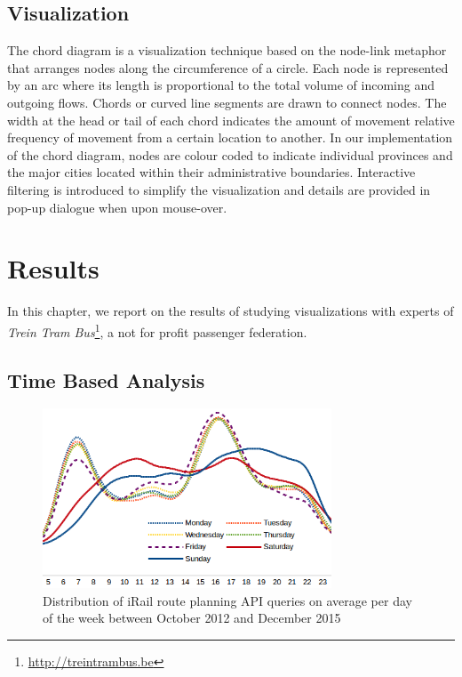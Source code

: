 \documentclass{sig-alternate}
\begin{document}
\subsection{Visualization}\label{sec:vis}
The chord diagram is a visualization technique based on the node-link metaphor that arranges nodes along the circumference of a circle. 
Each node is represented by an arc where its length is proportional to the total volume of incoming and outgoing flows. 
Chords or curved line segments are drawn to connect nodes. 
The width at the head or tail of each chord indicates the amount of movement relative frequency of movement from a certain location to another.
In our implementation of the chord diagram, nodes are colour coded to indicate individual provinces and the major cities located within their administrative boundaries. 
Interactive filtering is introduced to simplify the visualization and details are provided in pop-up dialogue when upon mouse-over.

\section{Results}
\label{sec:results}

In this chapter, we report on the results of studying visualizations with experts of \emph{Trein Tram Bus}\footnote{\url{http://treintrambus.be}}, a not for profit passenger federation.

\subsection{Time Based Analysis}
\begin{figure}[h]
\centering
\includegraphics[width=8.6cm]{avg-all}
\caption{Distribution of iRail route planning API queries on average per day of the week between October 2012 and December 2015}
\label{fig:average}
\end{figure}
\end{document}
